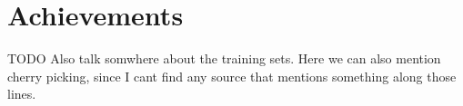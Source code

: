 \chapter{Achievements}
TODO Also talk somwhere about the training sets. Here we can also mention cherry picking, since I cant find any source that mentions something along those lines.





